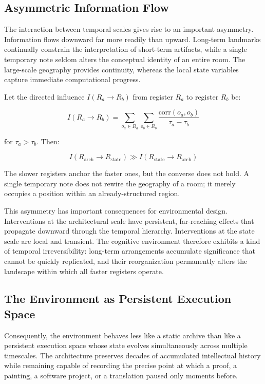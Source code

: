 \documentclass[12pt,oneside]{article}
\theoremstyle{remark}
\begin{document}
\subsection{Asymmetric Information Flow}

The interaction between temporal scales gives rise to an important asymmetry. Information flows downward far more readily than upward. Long-term landmarks continually constrain the interpretation of short-term artifacts, while a single temporary note seldom alters the conceptual identity of an entire room. The large-scale geography provides continuity, whereas the local state variables capture immediate computational progress.

Let the directed influence $I(R_a \to R_b)$ from register $R_a$ to register $R_b$ be:

\begin{equation}
I(R_a \to R_b) = \sum_{o_a \in R_a} \sum_{o_b \in R_b} \frac{\text{corr}(o_a, o_b)}{\tau_a - \tau_b}
\end{equation}

for $\tau_a > \tau_b$. Then:

\begin{equation}
I(R_{\text{arch}} \to R_{\text{state}}) \gg I(R_{\text{state}} \to R_{\text{arch}})
\end{equation}

The slower registers anchor the faster ones, but the converse does not hold. A single temporary note does not rewire the geography of a room; it merely occupies a position within an already-structured region.

This asymmetry has important consequences for environmental design. Interventions at the architectural scale have persistent, far-reaching effects that propagate downward through the temporal hierarchy. Interventions at the state scale are local and transient. The cognitive environment therefore exhibits a kind of temporal irreversibility: long-term arrangements accumulate significance that cannot be quickly replicated, and their reorganization permanently alters the landscape within which all faster registers operate.

\subsection{The Environment as Persistent Execution Space}

Consequently, the environment behaves less like a static archive than like a persistent execution space whose state evolves simultaneously across multiple timescales. The architecture preserves decades of accumulated intellectual history while remaining capable of recording the precise point at which a proof, a painting, a software project, or a translation paused only moments before.
\end{document}
